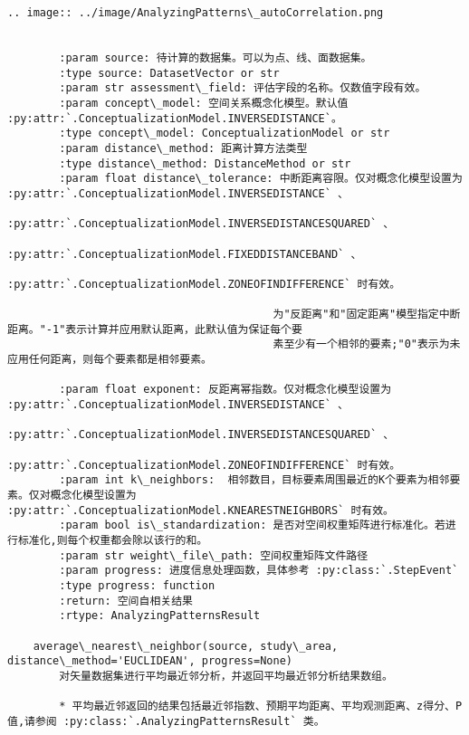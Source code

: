 \documentclass[11pt]{article}
\begin{document}
\begin{Verbatim}[commandchars=\\\{\}]
        .. image:: ../image/AnalyzingPatterns\_autoCorrelation.png
        
        
        :param source: 待计算的数据集。可以为点、线、面数据集。
        :type source: DatasetVector or str
        :param str assessment\_field: 评估字段的名称。仅数值字段有效。
        :param concept\_model: 空间关系概念化模型。默认值 :py:attr:`.ConceptualizationModel.INVERSEDISTANCE`。
        :type concept\_model: ConceptualizationModel or str
        :param distance\_method: 距离计算方法类型
        :type distance\_method: DistanceMethod or str
        :param float distance\_tolerance: 中断距离容限。仅对概念化模型设置为 :py:attr:`.ConceptualizationModel.INVERSEDISTANCE` 、
                                         :py:attr:`.ConceptualizationModel.INVERSEDISTANCESQUARED` 、
                                         :py:attr:`.ConceptualizationModel.FIXEDDISTANCEBAND` 、
                                         :py:attr:`.ConceptualizationModel.ZONEOFINDIFFERENCE` 时有效。
        
                                         为"反距离"和"固定距离"模型指定中断距离。"-1"表示计算并应用默认距离，此默认值为保证每个要
                                         素至少有一个相邻的要素;"0"表示为未应用任何距离，则每个要素都是相邻要素。
        
        :param float exponent: 反距离幂指数。仅对概念化模型设置为 :py:attr:`.ConceptualizationModel.INVERSEDISTANCE` 、
                                         :py:attr:`.ConceptualizationModel.INVERSEDISTANCESQUARED` 、
                                         :py:attr:`.ConceptualizationModel.ZONEOFINDIFFERENCE` 时有效。
        :param int k\_neighbors:  相邻数目，目标要素周围最近的K个要素为相邻要素。仅对概念化模型设置为 :py:attr:`.ConceptualizationModel.KNEARESTNEIGHBORS` 时有效。
        :param bool is\_standardization: 是否对空间权重矩阵进行标准化。若进行标准化,则每个权重都会除以该行的和。
        :param str weight\_file\_path: 空间权重矩阵文件路径
        :param progress: 进度信息处理函数，具体参考 :py:class:`.StepEvent`
        :type progress: function
        :return: 空间自相关结果
        :rtype: AnalyzingPatternsResult
    
    average\_nearest\_neighbor(source, study\_area, distance\_method='EUCLIDEAN', progress=None)
        对矢量数据集进行平均最近邻分析，并返回平均最近邻分析结果数组。
        
        * 平均最近邻返回的结果包括最近邻指数、预期平均距离、平均观测距离、z得分、P值,请参阅 :py:class:`.AnalyzingPatternsResult` 类。
        

\end{Verbatim}
\end{document}
